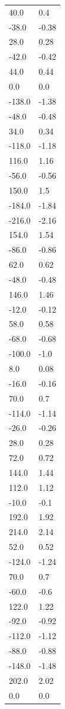 \begin{longtable}{ll}
40.0 & 0.4 \\
-38.0 & -0.38 \\
28.0 & 0.28 \\
-42.0 & -0.42 \\
44.0 & 0.44 \\
0.0 & 0.0 \\
-138.0 & -1.38 \\
-48.0 & -0.48 \\
34.0 & 0.34 \\
-118.0 & -1.18 \\
116.0 & 1.16 \\
-56.0 & -0.56 \\
150.0 & 1.5 \\
-184.0 & -1.84 \\
-216.0 & -2.16 \\
154.0 & 1.54 \\
-86.0 & -0.86 \\
62.0 & 0.62 \\
-48.0 & -0.48 \\
146.0 & 1.46 \\
-12.0 & -0.12 \\
58.0 & 0.58 \\
-68.0 & -0.68 \\
-100.0 & -1.0 \\
8.0 & 0.08 \\
-16.0 & -0.16 \\
70.0 & 0.7 \\
-114.0 & -1.14 \\
-26.0 & -0.26 \\
28.0 & 0.28 \\
72.0 & 0.72 \\
144.0 & 1.44 \\
112.0 & 1.12 \\
-10.0 & -0.1 \\
192.0 & 1.92 \\
214.0 & 2.14 \\
52.0 & 0.52 \\
-124.0 & -1.24 \\
70.0 & 0.7 \\
-60.0 & -0.6 \\
122.0 & 1.22 \\
-92.0 & -0.92 \\
-112.0 & -1.12 \\
-88.0 & -0.88 \\
-148.0 & -1.48 \\
202.0 & 2.02 \\
0.0 & 0.0 \\

\end{longtable}
